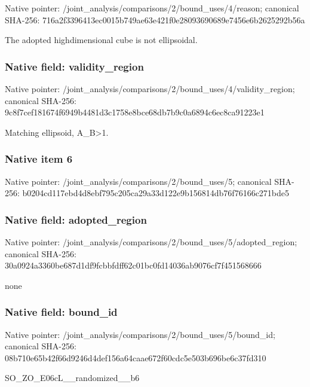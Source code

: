\documentclass[10pt,a4paper]{article}
\begin{document}
Native pointer: /joint\_analysis/comparis\allowbreak{}ons/2/bound\_uses/4/reaso\allowbreak{}n; canonical SHA-256: 716a2f3396413ec0015b749a\allowbreak{}e63e421f0e28093690689e74\allowbreak{}56e6b2625292b56a


The adopted highdimensional cube is not ellipsoidal.


\subsubsection{Native field: validity\_region}


Native pointer: /joint\_analysis/comparis\allowbreak{}ons/2/bound\_uses/4/valid\allowbreak{}ity\_region; canonical SHA-256: 9c8f7cef181674f6949b4481\allowbreak{}d3c1758e8bce68db7b9c0a68\allowbreak{}94c6ec8ca91223e1


Matching ellipsoid, A\_B>1.


\subsubsection{Native item 6}


Native pointer: /joint\_analysis/comparis\allowbreak{}ons/2/bound\_uses/5; canonical SHA-256: b0204cd117ebd4d8ebf795c2\allowbreak{}05ca29a33d122e9b156814db\allowbreak{}76f76166c271bde5



\subsubsection{Native field: adopted\_region}


Native pointer: /joint\_analysis/comparis\allowbreak{}ons/2/bound\_uses/5/adopt\allowbreak{}ed\_region; canonical SHA-256: 30a0924a3360be687d1df9fc\allowbreak{}bbfdff62c01bc0fd14036ab9\allowbreak{}076cf7f451568666


none


\subsubsection{Native field: bound\_id}


Native pointer: /joint\_analysis/comparis\allowbreak{}ons/2/bound\_uses/5/bound\allowbreak{}\_id; canonical SHA-256: 08b710e65b42f66d9246d4de\allowbreak{}f156a64caae672f60cdc5e50\allowbreak{}3b696be6c37fd310


SO\_ZO\_E06cL\_\_randomized\_\_b6
\end{document}
